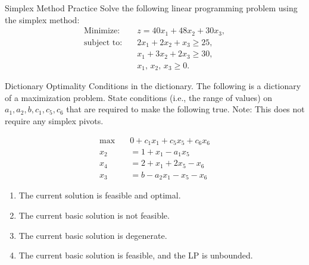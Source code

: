 \begin{ex}{Simplex Method Practice}{}
\label{ex:simplex-bigm-practice-2}
 Solve the following linear programming problem using the simplex method:
\[
\begin{aligned}
\text{Minimize:}\quad & z = 40x_{1} + 48x_{2} + 30x_{3}, \\
\text{subject to:}\quad & 2x_{1} + 2x_{2} + x_{3} \ge 25,\\
& x_{1} + 3x_{2} + 2x_{3} \ge 30,\\
& x_{1},\, x_{2},\, x_{3} \ge 0.
\end{aligned}
\]
\exrefs{\S\ref{sec:big-m-dictionary}}
\end{ex}


\begin{ex}{Dictionary Optimality}{}
\label{ex:dictionary-optimality-conditions}
 {Conditions in the dictionary.} The following is a dictionary of a maximization problem. State conditions (i.e., the range of values) on $a_{1}, a_{2}, b, c_{1}, c_{5}, c_{6}$ that are required to make the following true.  Note: This does not require any simplex pivots.
\begin{center}
\begin{align*}
\max \quad &0 + c_1 x_1 + c_5 x_5 + c_6 x_6 \\
x_2 &= 1 + x_1 - a_1 x_5 \\
x_4 &= 2 + x_1 + 2x_5 - x_6 \\
x_3 &= b - a_2 x_1 - x_5 - x_6
\end{align*}
\end{center}

\begin{enumerate}
\item  The current solution is feasible and optimal.
\item The current basic solution is not feasible.
\item  The current basic solution is degenerate.
\item  The current basic solution is feasible, and the LP is unbounded.
\end{enumerate}
\exrefs{\S\ref{sec:simplex-algorithm}; \S\ref{sec:degeneracy}}
\end{ex}

